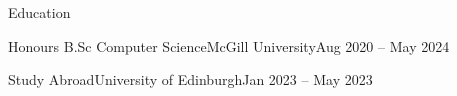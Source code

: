 \documentclass[]{mcdowellcv}
\begin{document}
\let\CITY=M

\let\WEB=F

\makeheader

\begin{cvsection}{Education}
	\begin{cvsubsection}{\normalfont Honours B.Sc Computer Science}{McGill University}{Aug 2020 -- May 2024}
	\end{cvsubsection}
	\vspace{-12mm}
	\begin{cvsubsection}{\normalfont Study Abroad}{University of Edinburgh}{Jan 2023 -- May 2023}
	\end{cvsubsection}
	\vspace{-13mm}
\end{cvsection}
\end{document}
